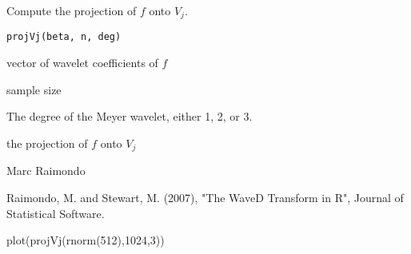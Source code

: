 \begin{Description}\relax
Compute the projection of $f$ onto $V_j$.
\end{Description}
\begin{Usage}
\begin{verbatim}
projVj(beta, n, deg)
\end{verbatim}
\end{Usage}
\begin{Arguments}
\begin{ldescription}
\item[\code{beta}] vector of wavelet coefficients of $f$
\item[\code{n}] sample size
\item[\code{deg}] The degree of the Meyer wavelet, either 1, 2, or 3.
\end{ldescription}
\end{Arguments}
\begin{Value}
the projection of $f$ onto $V_j$
\end{Value}
\begin{Author}\relax
Marc Raimondo
\end{Author}
\begin{References}\relax
Raimondo, M. and Stewart, M. (2007),
"The WaveD Transform in R", Journal of Statistical Software.
\end{References}
\begin{SeeAlso}\relax
{}
\end{SeeAlso}
\begin{Examples}
\begin{ExampleCode}
 plot(projVj(rnorm(512),1024,3))
\end{ExampleCode}
\end{Examples}

